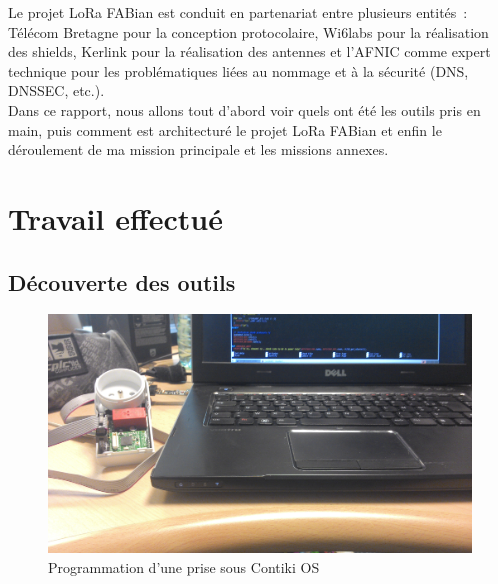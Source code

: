 \documentclass{article}
\begin{document}
Le projet LoRa FABian est conduit en partenariat entre plusieurs entités~: Télécom Bretagne pour la conception protocolaire, Wi6labs pour la réalisation des shields, Kerlink pour la réalisation des antennes et l'AFNIC comme expert technique pour les problématiques liées au nommage et à la sécurité (DNS, DNSSEC, etc.).\\
Dans ce rapport, nous allons tout d'abord voir quels ont été les outils pris en main, puis comment est architecturé le projet LoRa FABian et enfin le déroulement de ma mission principale et les missions annexes.

\section{Travail effectué}
\subsection{Découverte des outils}

	\begin{figure}[h]
		\begin{center}
			\includegraphics[scale=0.08]{../res/img/progprise.jpg}
			\caption{Programmation d'une prise sous Contiki OS}
			\label{fig:progprise}
		\end{center}
	\end{figure}
\end{document}
